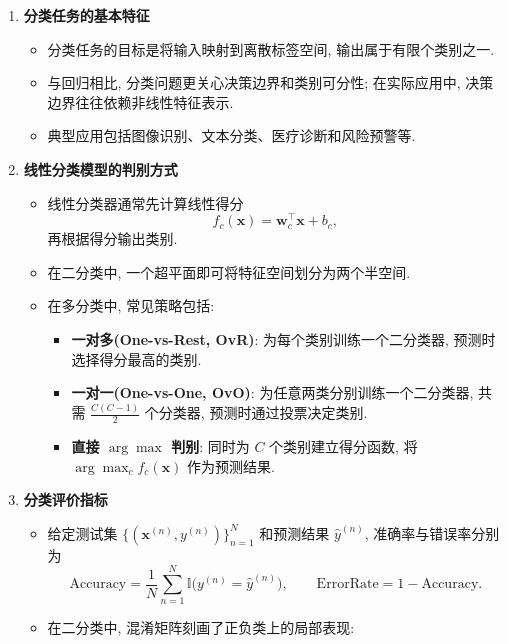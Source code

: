 \documentclass{../nndlcourse}
\begin{document}
\begin{enumerate}
    \item \textbf{分类任务的基本特征}
    \begin{itemize}
        \item 分类任务的目标是将输入映射到离散标签空间, 输出属于有限个类别之一.
        \item 与回归相比, 分类问题更关心决策边界和类别可分性; 在实际应用中, 决策边界往往依赖非线性特征表示.
        \item 典型应用包括图像识别、文本分类、医疗诊断和风险预警等.
    \end{itemize}
    \item \textbf{线性分类模型的判别方式}
    \begin{itemize}
        \item 线性分类器通常先计算线性得分
        \begin{equation*}
            f_c(\boldsymbol{x}) = \boldsymbol{w}_c^\top \boldsymbol{x} + b_c,
        \end{equation*}
        再根据得分输出类别.
        \item 在二分类中, 一个超平面即可将特征空间划分为两个半空间.
        \item 在多分类中, 常见策略包括:
        \begin{itemize}
            \item \textbf{一对多(One-vs-Rest, OvR)}: 为每个类别训练一个二分类器, 预测时选择得分最高的类别.
            \item \textbf{一对一(One-vs-One, OvO)}: 为任意两类分别训练一个二分类器, 共需 $\frac{C(C-1)}{2}$ 个分类器, 预测时通过投票决定类别.
            \item \textbf{直接 $\arg\max$ 判别}: 同时为 $C$ 个类别建立得分函数, 将 $\arg\max_c f_c(\boldsymbol{x})$ 作为预测结果.
        \end{itemize}
    \end{itemize}
    \item \textbf{分类评价指标}
    \begin{itemize}
        \item 给定测试集 $\{(\boldsymbol{x}^{(n)}, y^{(n)})\}_{n=1}^N$ 和预测结果 $\hat{y}^{(n)}$, 准确率与错误率分别为
        \begin{equation*}
            \mathrm{Accuracy} = \frac{1}{N} \sum_{n=1}^N \mathbb{I}\bigl(y^{(n)} = \hat{y}^{(n)}\bigr),
            \qquad
            \mathrm{ErrorRate} = 1 - \mathrm{Accuracy}.
        \end{equation*}
        \item 在二分类中, 混淆矩阵刻画了正负类上的局部表现:

\end{itemize}
\end{enumerate}
\end{document}
